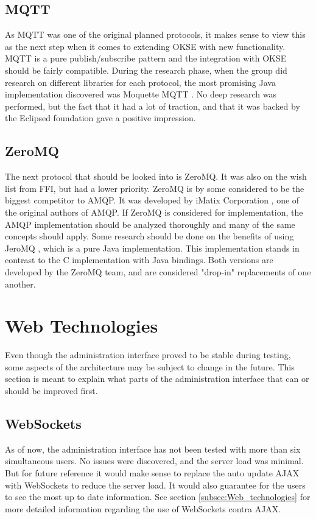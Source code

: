 \subsection{MQTT}
As MQTT was one of the original planned protocols, it makes sense to view this as the next step when it comes to extending OKSE with new functionality. MQTT is a pure publish/subscribe pattern and the integration with OKSE should be fairly compatible. 
During the research phase, when the group did research on different libraries for each protocol, the most promising Java implementation discovered was Moquette MQTT \cite{moquette-mqtt}. No deep research was performed, but the fact that it had a lot of traction, and that it was backed by the Eclipsed foundation gave a positive impression.

\subsection{ZeroMQ}
The next protocol that should be looked into is ZeroMQ. It was also on the wish list from FFI, but had a lower priority. ZeroMQ is by some considered to be the biggest competitor to AMQP. It was developed by iMatix Corporation \cite{imatix}, one of the original authors of AMQP. If ZeroMQ is considered for implementation, the AMQP implementation should be analyzed thoroughly and many of the same concepts should apply. Some research should be done on the benefits of using JeroMQ \cite{jero-mq}, which is a pure Java implementation. This implementation stands in contrast to the C implementation with Java bindings. Both versions are developed by the ZeroMQ team, and are considered "drop-in" replacements of one another.

\section{Web Technologies}
Even though the administration interface proved to be stable during testing, some aspects of the architecture may be subject to change in the future. This section is meant to explain what parts of the administration interface that can or should be improved first. 

\subsection{WebSockets}
As of now, the administration interface has not been tested with more than six simultaneous users. No issues were discovered, and the server load was minimal. But for future reference it would make sense to replace the auto update AJAX with WebSockets to reduce the server load. It would also guarantee for the users to see the most up to date information. See section \ref{subsec:Web_technologies} for more detailed information regarding the use of WebSockets contra AJAX.

\clearpage
